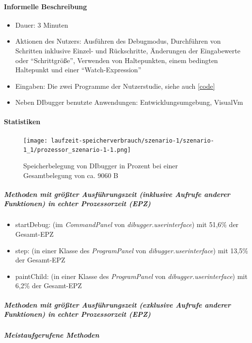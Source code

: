 \documentclass[parskip=full]{scrartcl}
\begin{document}
        \paragraph{Informelle Beschreibung}
        \begin{itemize}
            \item{Dauer:} 3 Minuten 
            \item{Aktionen des Nutzers:} Ausführen des Debugmodus, Durchführen von Schritten inklusive Einzel- und Rückschritte, Änderungen der Eingabewerte oder \enquote{Schrittgröße}, Verwenden von Haltepunkten, einem bedingten Haltepunkt und einer \enquote{Watch-Expression}
            \item{Eingaben:} Die zwei Programme der Nutzerstudie, siehe auch \ref{code}
            \item{Neben DIbugger benutzte Anwendungen:} Entwicklungsumgebung, VisualVm
        \end{itemize}
        \paragraph{Statistiken}
        \begin{figure}[!h]
            \centering
            \texttt{[image: laufzeit-speicherverbrauch/szenario-1/szenario-1\_1/prozessor\_szenario-1-1.png]}
            \caption{Speicherbelegung von DIbugger in Prozent bei einer Gesamtbelegung von ca. 9060 B}
        \end{figure}
        \subparagraph{Methoden mit größter Ausführungszeit (inklusive Aufrufe anderer Funktionen) in echter Prozessorzeit (EPZ)}
        \begin{itemize}
            \item{startDebug}: (im \textit{CommandPanel} von \textit{dibugger.userinterface}) mit 51,6\% der Gesamt-EPZ
            \item{step}: (in einer Klasse des \textit{ProgramPanel} von \textit{dibugger.userinterface}) mit 13,5\% der Gesamt-EPZ
            \item{paintChild}: (in einer Klasse des \textit{ProgramPanel} von \textit{dibugger.userinterface}) mit 6,2\% der Gesamt-EPZ
        \end{itemize}
        \subparagraph{Methoden mit größter Ausführungszeit (exklusive Aufrufe anderer Funktionen) in echter Prozessorzeit (EPZ)}
        \begin{itemize}

        \end{itemize}
        \subparagraph{Meistaufgerufene Methoden}
        \begin{itemize}

        \end{itemize}
\end{document}
